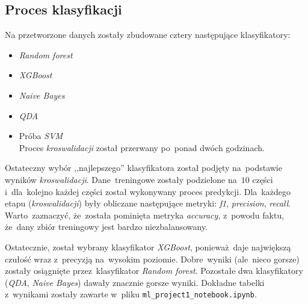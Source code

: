 \documentclass[11pt, a4paper]{article}
\begin{document}
\subsection{Proces klasyfikacji}
Na przetworzone danych zostały zbudowane cztery następujące klasyfikatory:
\begin{itemize}
    \item \textit{Random forest} 
    \item \textit{XGBoost}
    \item \textit{Naive Bayes}
    \item \textit{QDA}
    \item Próba \textit{SVM} \\
    Proces \textit{kroswalidacji} został przerwany po~ponad dwóch godzinach.
\end{itemize}
Ostateczny wybór ,,najlepszego'' klasyfikatora został podjęty na~podstawie wyników \textit{kroswalidacji}. Dane~treningowe zostały podzielone na~$10$ części i~dla~kolejno każdej części został wykonywany proces predykcji. Dla~każdego etapu (\textit{kroswalidacji}) były obliczane następujące metryki:
\textit{f1}, \textit{precision}, \textit{recall}.
Warto~zaznaczyć, że~została pominięta metryka \textit{accuracy}, z~powodu faktu, że~dany zbiór treningowy jest bardzo niezbalansowany.

Ostatecznie, został wybrany klasyfikator \textit{XGBoost}, ponieważ~daje największą czułość wraz z~precyzją na~wysokim poziomie. Dobre~wyniki (ale~nieco gorsze) zostały osiągnięte przez~klasyfikator \textit{Random forest}. Pozostałe dwa klasyfikatory (\textit{QDA}, \textit{Naive Bayes}) dawały znacznie gorsze wyniki.
Dokładne tabelki z~wynikami zostały zawarte w~pliku \texttt{ml\_project1\_notebook.ipynb}.
\end{document}
